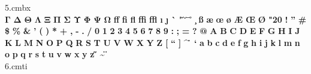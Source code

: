 \documentclass{article}
\begin{document}
5.cmbx\\
\noindent $\mathbf{\Gamma}$ $\mathbf{\Delta}$ $\mathbf{\Theta}$ $\mathbf{\Lambda}$ $\mathbf{\Xi}$ $\mathbf{\Pi}$ $\mathbf{\Sigma}$ $\mathbf{\Upsilon}$ $\mathbf{\Phi}$ $\mathbf{\Psi}$ $\mathbf{\Omega}$ \textbf{ff} \textbf{fi} \textbf{fl} \textbf{ffi} \textbf{ffl} \textbf{\i} \textbf{\j} \textbf{\`} \textbf{\'} \textbf{\v} \textbf{\u} \textbf{\=} \textbf{\r} \textbf{\c} \textbf{\ss} \textbf{\ae} \textbf{\oe} \textbf{\o} \textbf{\AE} \textbf{\OE} \textbf{\O} \textbf{\selectfont\char"20} \textbf{!} \textbf{\textquotedblright} \textbf{\#} \textbf{\$} \textbf{\%} \textbf{\&} \textbf{'} \textbf{(} \textbf{)} \textbf{*} \textbf{+} \textbf{,} \textbf{-} \textbf{.} \textbf{/} \textbf{0} \textbf{1} \textbf{2} \textbf{3} \textbf{4} \textbf{5} \textbf{6} \textbf{7} \textbf{8} \textbf{9} \textbf{:} \textbf{;} \textbf{\textexclamdown} \textbf{=} \textbf{\textquestiondown} \textbf{?} \textbf{@} \textbf{A} \textbf{B} \textbf{C} \textbf{D} \textbf{E} \textbf{F} \textbf{G} \textbf{H} \textbf{I} \textbf{J} \textbf{K} \textbf{L} \textbf{M} \textbf{N} \textbf{O} \textbf{P} \textbf{Q} \textbf{R} \textbf{S} \textbf{T} \textbf{U} \textbf{V} \textbf{W} \textbf{X} \textbf{Y} \textbf{Z} \textbf{[} \textbf{\textquotedblleft} \textbf{]} \textbf{\^} \textbf{\.} \textbf{\textquoteleft} \textbf{a} \textbf{b} \textbf{c} \textbf{d} \textbf{e} \textbf{f} \textbf{g} \textbf{h} \textbf{i} \textbf{j} \textbf{k} \textbf{l} \textbf{m} \textbf{n} \textbf{o} \textbf{p} \textbf{q} \textbf{r} \textbf{s} \textbf{t} \textbf{u} \textbf{v} \textbf{w} \textbf{x} \textbf{y} \textbf{z} \textbf{\textendash} \textbf{\textemdash} \textbf{\H} \textbf{\~} \textbf{\"}\\
6.cmti
\end{document}
